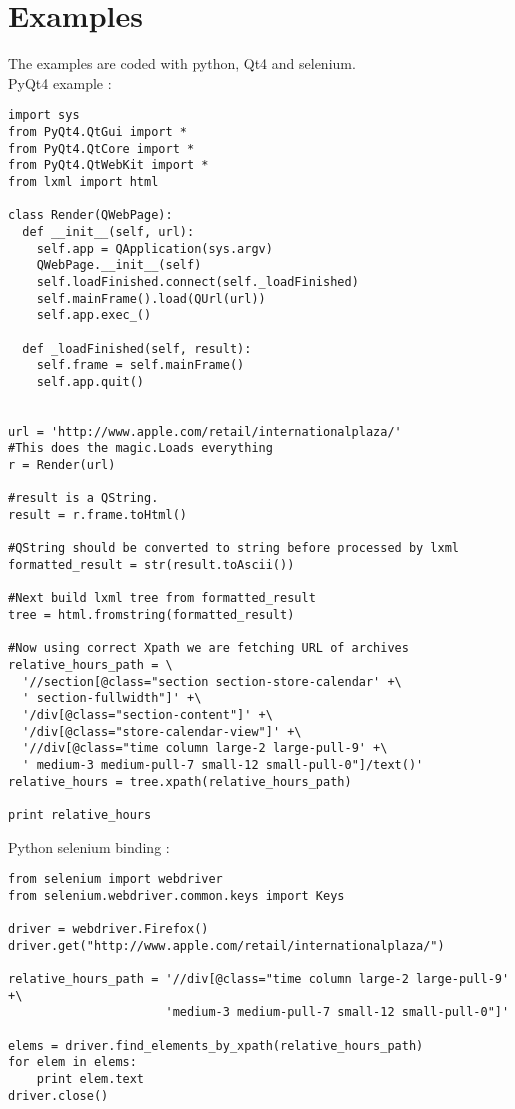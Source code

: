 \section{Examples}

The examples are coded with python, Qt4 and selenium.\\

PyQt4 example \cite{2015}:\\


\begin{lstlisting}
import sys
from PyQt4.QtGui import *
from PyQt4.QtCore import *
from PyQt4.QtWebKit import *
from lxml import html

class Render(QWebPage):
  def __init__(self, url):
    self.app = QApplication(sys.argv)
    QWebPage.__init__(self)
    self.loadFinished.connect(self._loadFinished)
    self.mainFrame().load(QUrl(url))
    self.app.exec_()

  def _loadFinished(self, result):
    self.frame = self.mainFrame()
    self.app.quit()


url = 'http://www.apple.com/retail/internationalplaza/'
#This does the magic.Loads everything
r = Render(url)

#result is a QString.
result = r.frame.toHtml()

#QString should be converted to string before processed by lxml
formatted_result = str(result.toAscii())

#Next build lxml tree from formatted_result
tree = html.fromstring(formatted_result)

#Now using correct Xpath we are fetching URL of archives
relative_hours_path = \
  '//section[@class="section section-store-calendar' +\
  ' section-fullwidth"]' +\
  '/div[@class="section-content"]' +\
  '/div[@class="store-calendar-view"]' +\
  '//div[@class="time column large-2 large-pull-9' +\
  ' medium-3 medium-pull-7 small-12 small-pull-0"]/text()'
relative_hours = tree.xpath(relative_hours_path)

print relative_hours
\end{lstlisting}

Python selenium binding \cite{Muthukad2014}:\\

\lstset{caption=Selenium binding}

\begin{lstlisting}
from selenium import webdriver
from selenium.webdriver.common.keys import Keys

driver = webdriver.Firefox()
driver.get("http://www.apple.com/retail/internationalplaza/")

relative_hours_path = '//div[@class="time column large-2 large-pull-9' +\
                      'medium-3 medium-pull-7 small-12 small-pull-0"]'

elems = driver.find_elements_by_xpath(relative_hours_path)
for elem in elems:
    print elem.text
driver.close()
\end{lstlisting}


